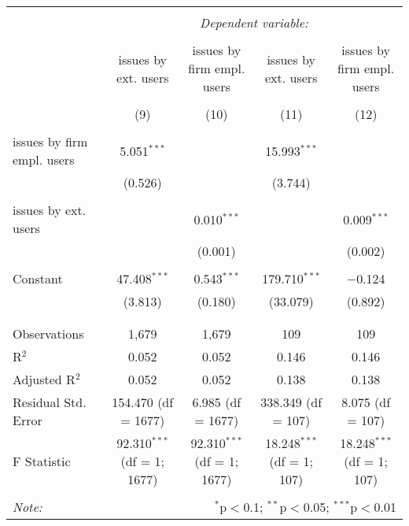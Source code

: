 
\begin{tabular}{@{\extracolsep{5pt}}lcccc}
\\[-1.8ex]\hline
\hline \\[-1.8ex]
 & \multicolumn{4}{c}{\textit{Dependent variable:}} \\
\cline{2-5}
\\[-1.8ex] & issues by ext. users & issues by firm empl. users & issues by ext. users & issues by firm empl. users \\
\\[-1.8ex] & (9) & (10) & (11) & (12)\\ 
\hline \\[-1.8ex]
 issues by firm empl. users & 5.051$^{***}$ &  & 15.993$^{***}$ &  \\
  & (0.526) &  & (3.744) &  \\
  & & & & \\
 issues by ext. users &  & 0.010$^{***}$ &  & 0.009$^{***}$ \\
  &  & (0.001) &  & (0.002) \\
  & & & & \\
 Constant & 47.408$^{***}$ & 0.543$^{***}$ & 179.710$^{***}$ & $-$0.124 \\
  & (3.813) & (0.180) & (33.079) & (0.892) \\
  & & & & \\
\hline \\[-1.8ex]
Observations & 1,679 & 1,679 & 109 & 109 \\
R$^{2}$ & 0.052 & 0.052 & 0.146 & 0.146 \\
Adjusted R$^{2}$ & 0.052 & 0.052 & 0.138 & 0.138 \\
Residual Std. Error & 154.470 (df = 1677) & 6.985 (df = 1677) & 338.349 (df = 107) & 8.075 (df = 107) \\
F Statistic & 92.310$^{***}$ (df = 1; 1677) & 92.310$^{***}$ (df = 1; 1677) & 18.248$^{***}$ (df = 1; 107) & 18.248$^{***}$ (df = 1; 107) \\
\hline
\hline \\[-1.8ex]
\textit{Note:}  & \multicolumn{4}{r}{$^{*}$p$<$0.1; $^{**}$p$<$0.05; $^{***}$p$<$0.01} \\
\end{tabular}
